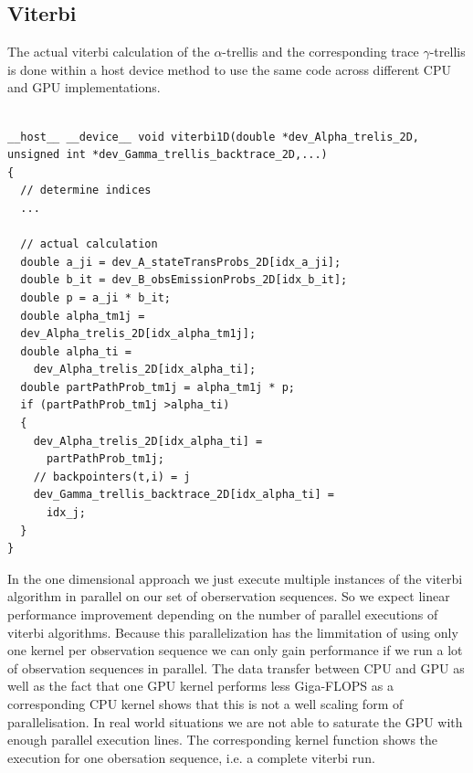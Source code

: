 \documentclass[english, paper=a4]{scrartcl}
\begin{document}
\subsection{Viterbi}

The actual viterbi calculation of the $\alpha$-trellis and the corresponding trace $\gamma$-trellis is done within a host device method to use the same code across different CPU and GPU implementations.

\begin{verbatim}

__host__ __device__ void viterbi1D(double *dev_Alpha_trelis_2D, 
unsigned int *dev_Gamma_trellis_backtrace_2D,...)
{
  // determine indices
  ...

  // actual calculation
  double a_ji = dev_A_stateTransProbs_2D[idx_a_ji];
  double b_it = dev_B_obsEmissionProbs_2D[idx_b_it];
  double p = a_ji * b_it;
  double alpha_tm1j = 
  dev_Alpha_trelis_2D[idx_alpha_tm1j];
  double alpha_ti = 
    dev_Alpha_trelis_2D[idx_alpha_ti];
  double partPathProb_tm1j = alpha_tm1j * p;
  if (partPathProb_tm1j >alpha_ti)
  {
    dev_Alpha_trelis_2D[idx_alpha_ti] = 
      partPathProb_tm1j;
    // backpointers(t,i) = j
    dev_Gamma_trellis_backtrace_2D[idx_alpha_ti] = 
      idx_j;
  }
}

\end{verbatim}

In the one dimensional approach we just execute multiple instances of the viterbi algorithm in parallel on our set of oberservation sequences. So we expect linear performance improvement depending on the number of parallel executions of viterbi algorithms. Because this parallelization has the limmitation of using only one kernel per observation sequence we can only gain performance if we run a lot of observation sequences in parallel. The data transfer between CPU and GPU as well as the fact that one GPU kernel performs less Giga-FLOPS as a corresponding CPU kernel shows that this is not a well scaling form of parallelisation.
In real world situations we are not able to saturate the GPU with enough parallel execution lines.
The corresponding kernel function shows the execution for one obersation sequence, i.e. a complete viterbi run.
\end{document}
